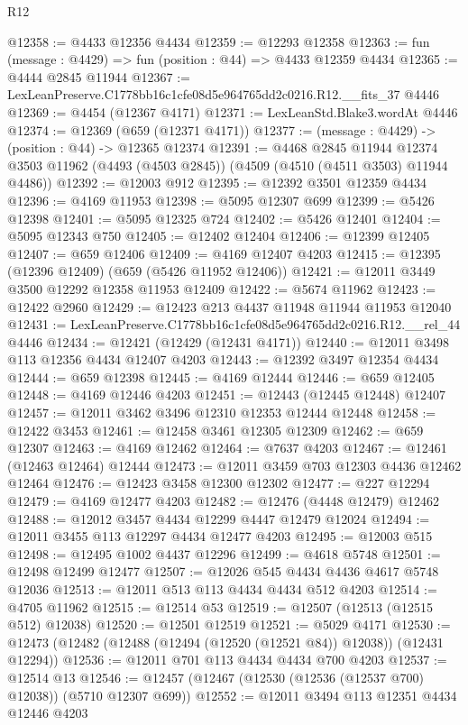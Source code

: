 \begin{lexlean}{R12}
\begin{coremodule}
@12358 := @4433 @12356 @4434
@12359 := @12293 @12358
@12363 := fun (message : @4429) => fun (position : @44) => @4433 @12359 @4434
@12365 := @4444 @2845 @11944
@12367 := LexLeanPreserve.C1778bb16c1cfe08d5e964765dd2c0216.R12.__fits_37 @4446
@12369 := @4454 (@12367 @4171)
@12371 := LexLeanStd.Blake3.wordAt @4446
@12374 := @12369 (@659 (@12371 @4171))
@12377 := (message : @4429) -> (position : @44) -> @12365 @12374
@12391 := @4468
    @2845
    @11944
    @12374
    @3503
    @11962
    (@4493 (@4503 @2845))
    (@4509 (@4510 (@4511 @3503) @11944 @4486))
@12392 := @12003 @912
@12395 := @12392 @3501 @12359 @4434
@12396 := @4169 @11953
@12398 := @5095 @12307 @699
@12399 := @5426 @12398
@12401 := @5095 @12325 @724
@12402 := @5426 @12401
@12404 := @5095 @12343 @750
@12405 := @12402 @12404
@12406 := @12399 @12405
@12407 := @659 @12406
@12409 := @4169 @12407 @4203
@12415 := @12395 (@12396 @12409) (@659 (@5426 @11952 @12406))
@12421 := @12011 @3449 @3500 @12292 @12358 @11953 @12409
@12422 := @5674 @11962
@12423 := @12422 @2960
@12429 := @12423 @213 @4437 @11948 @11944 @11953 @12040
@12431 := LexLeanPreserve.C1778bb16c1cfe08d5e964765dd2c0216.R12.__rel_44 @4446
@12434 := @12421 (@12429 (@12431 @4171))
@12440 := @12011 @3498 @113 @12356 @4434 @12407 @4203
@12443 := @12392 @3497 @12354 @4434
@12444 := @659 @12398
@12445 := @4169 @12444
@12446 := @659 @12405
@12448 := @4169 @12446 @4203
@12451 := @12443 (@12445 @12448) @12407
@12457 := @12011 @3462 @3496 @12310 @12353 @12444 @12448
@12458 := @12422 @3453
@12461 := @12458 @3461 @12305 @12309
@12462 := @659 @12307
@12463 := @4169 @12462
@12464 := @7637 @4203
@12467 := @12461 (@12463 @12464) @12444
@12473 := @12011 @3459 @703 @12303 @4436 @12462 @12464
@12476 := @12423 @3458 @12300 @12302
@12477 := @227 @12294
@12479 := @4169 @12477 @4203
@12482 := @12476 (@4448 @12479) @12462
@12488 := @12012 @3457 @4434 @12299 @4447 @12479 @12024
@12494 := @12011 @3455 @113 @12297 @4434 @12477 @4203
@12495 := @12003 @515
@12498 := @12495 @1002 @4437 @12296
@12499 := @4618 @5748
@12501 := @12498 @12499 @12477
@12507 := @12026 @545 @4434 @4436 @4617 @5748 @12036
@12513 := @12011 @513 @113 @4434 @4434 @512 @4203
@12514 := @4705 @11962
@12515 := @12514 @53
@12519 := @12507 (@12513 (@12515 @512) @12038)
@12520 := @12501 @12519
@12521 := @5029 @4171
@12530 := @12473 (@12482 (@12488 (@12494 (@12520 (@12521 @84)) @12038)) (@12431 @12294))
@12536 := @12011 @701 @113 @4434 @4434 @700 @4203
@12537 := @12514 @13
@12546 := @12457 (@12467 (@12530 (@12536 (@12537 @700) @12038)) (@5710 @12307 @699))
@12552 := @12011 @3494 @113 @12351 @4434 @12446 @4203

\end{coremodule}
\end{lexlean}
